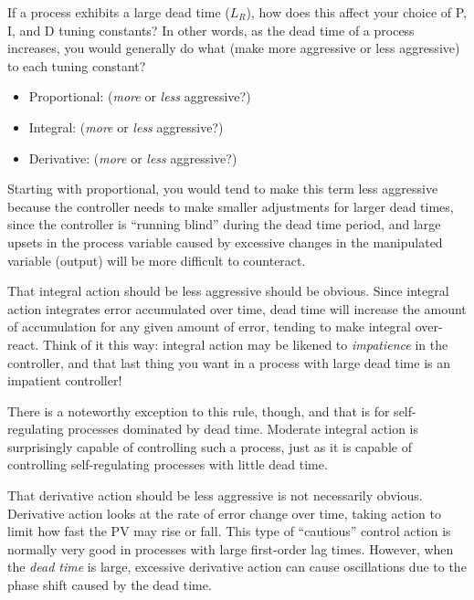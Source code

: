 

If a process exhibits a large dead time ($L_R$), how does this affect your choice of P, I, and D tuning constants?  In other words, as the dead time of a process increases, you would generally do what (make more aggressive or less aggressive) to each tuning constant?

\begin{itemize}
\item{}Proportional: ({\it more} or {\it less} aggressive?)
\vskip 5pt
\item{}Integral: ({\it more} or {\it less} aggressive?)
\vskip 5pt
\item{}Derivative: ({\it more} or {\it less} aggressive?)
\end{itemize} 







Starting with proportional, you would tend to make this term less aggressive because the controller needs to make smaller adjustments for larger dead times, since the controller is ``running blind'' during the dead time period, and large upsets in the process variable caused by excessive changes in the manipulated variable (output) will be more difficult to counteract.

\vskip 10pt

That integral action should be less aggressive should be obvious.  Since integral action integrates error accumulated over time, dead time will increase the amount of accumulation for any given amount of error, tending to make integral over-react.  Think of it this way: integral action may be likened to {\it impatience} in the controller, and that last thing you want in a process with large dead time is an impatient controller!

There is a noteworthy exception to this rule, though, and that is for self-regulating processes dominated by dead time.  Moderate integral action is surprisingly capable of controlling such a process, just as it is capable of controlling self-regulating processes with little dead time.

\vskip 10pt

That derivative action should be less aggressive is not necessarily obvious.  Derivative action looks at the rate of error change over time, taking action to limit how fast the PV may rise or fall.  This type of ``cautious'' control action is normally very good in processes with large first-order lag times.  However, when the {\it dead time} is large, excessive derivative action can cause oscillations due to the phase shift caused by the dead time.

